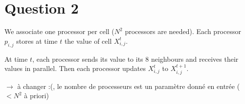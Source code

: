 
\section{Question 2}

We associate one processor per cell ($N^2$ processors are needed). Each processor $p_{i,j}$ stores at time $t$ the value of cell $X^{t}_{i,j}$.

At time $t$, each processor sends its value to its 8 neighbours and receives their values in parallel. Then each processor updates $X^{t}_{i,j}$ to $X^{t+1}_{i,j}$. 

$\longrightarrow$ à changer :(, le nombre de processeurs est un paramètre donné en entrée ($< N^2$ à priori)






